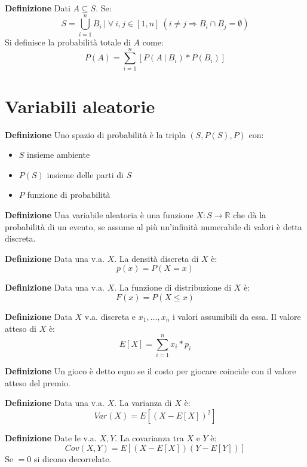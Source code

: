\documentclass{article}
\begin{document}
\noindent\textbf{Definizione} Dati $A\subseteq S$. Se:
$$S=\bigcup_{i=1}^nB_i\ |\ \forall\ i,j\in[1,n]\ (i\neq j\Rightarrow B_i\cap B_j=\emptyset)$$
\noindent Si definisce la probabilità totale di $A$ come:
$$P(A)=\sum_ {i=1}^n[P(A\ |\ B_i)*P(B_i)]$$\newline

\section{Variabili aleatorie}

\textbf{Definizione} Uno spazio di probabilità è la tripla $(S,P(S),P)$ con:
\begin{itemize}
    \item $S$ insieme ambiente
    \item $P(S)$ insieme delle parti di $S$
    \item $P$ funzione di probabilità\newline
\end{itemize}

\noindent\textbf{Definizione} Una variabile aleatoria è una funzione $X:S\rightarrow\mathbb{R}$ che dà la probabilità di un evento, se assume al più un'infinità numerabile di valori è detta discreta.\newline

\noindent\textbf{Definizione} Data una v.a. $X$. La densità discreta di $X$ è:
$$p(x)=P(X=x)$$\newline

\noindent\textbf{Definizione} Data una v.a. $X$. La funzione di distribuzione di $X$ è:
$$F(x)=P(X\leq x)$$\newline

\noindent\textbf{Definizione} Data $X$ v.a. discreta e $x_1,\ldots,x_n$ i valori assumibili da essa. Il valore atteso di $X$ è:
$$E[X]=\sum_{i=1}^nx_i*p_i$$\newline

\noindent\textbf{Definizione} Un gioco è detto equo se il costo per giocare coincide con il valore atteso del premio.\newline

\noindent\textbf{Definizione} Data una v.a. $X$. La varianza di $X$ è:
$$Var(X)=E[(X-E[X])^2]$$\newline

\noindent\textbf{Definizione} Date le v.a. $X,Y$. La covarianza tra $X$ e $Y$ è:
$$Cov(X,Y)=E[(X-E[X])(Y-E[Y])]$$
\noindent Se $=0$ si dicono decorrelate.\newline
\end{document}
